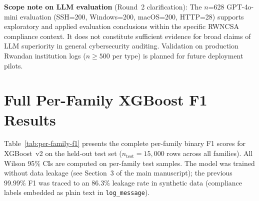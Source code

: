 \documentclass[11pt,a4paper]{article}
\begin{document}
\noindent\textbf{Scope note on LLM evaluation} (Round~2 clarification): The $n$=628
GPT-4o-mini evaluation (SSH=200, Windows=200, macOS=200, HTTP=28) supports exploratory
and applied evaluation conclusions within the specific RWNCSA compliance context. It does
not constitute sufficient evidence for broad claims of LLM superiority in general
cybersecurity auditing. Validation on production Rwandan institution logs
($n \geq 500$ per type) is planned for future deployment pilots.

\newpage

\section{Full Per-Family XGBoost F1 Results}
\label{sec:per-family-f1}

Table~\ref{tab:per-family-f1} presents the complete per-family binary F1 scores for XGBoost~v2
on the held-out test set ($n_{\text{test}} = 15{,}000$ rows across all families).
All Wilson 95\% CIs are computed on per-family test samples.
The model was trained without data leakage (see Section~3 of the main manuscript);
the previous 99.99\% F1 was traced to an 86.3\% leakage rate in synthetic data
(compliance labels embedded as plain text in \texttt{log\_message}).
\end{document}
